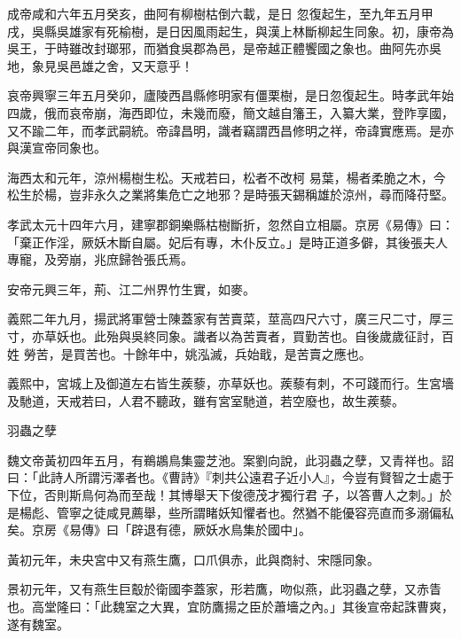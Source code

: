 \begin{pinyinscope}
 成帝咸和六年五月癸亥，曲阿有柳樹枯倒六載，是日
 忽復起生，至九年五月甲戌，吳縣吳雄家有死榆樹，是日因風雨起生，與漢上林斷柳起生同象。初，康帝為吳王，于時雖改封瑯邪，而猶食吳郡為邑，是帝越正體饗國之象也。曲阿先亦吳地，象見吳邑雄之舍，又天意乎！



 哀帝興寧三年五月癸卯，廬陵西昌縣修明家有僵栗樹，是日忽復起生。時孝武年始四歲，俄而哀帝崩，海西即位，未幾而廢，簡文越自籓王，入纂大業，登阼享國，又不踰二年，而孝武嗣統。帝諱昌明，識者竊謂西昌修明之祥，帝諱實應焉。是亦與漢宣帝同象也。



 海西太和元年，涼州楊樹生松。天戒若曰，松者不改柯
 易葉，楊者柔脆之木，今松生於楊，豈非永久之業將集危亡之地邪？是時張天錫稱雄於涼州，尋而降苻堅。



 孝武太元十四年六月，建寧郡銅樂縣枯樹斷折，忽然自立相屬。京房《易傳》曰：「棄正作淫，厥妖木斷自屬。妃后有專，木仆反立。」是時正道多僻，其後張夫人專寵，及旁崩，兆庶歸咎張氏焉。



 安帝元興三年，荊、江二州界竹生實，如麥。



 義熙二年九月，揚武將軍營士陳蓋家有苦賣菜，莖高四尺六寸，廣三尺二寸，厚三寸，亦草妖也。此殆與吳終同象。識者以為苦賣者，買勤苦也。自後歲歲征討，百姓
 勞苦，是買苦也。十餘年中，姚泓滅，兵始戢，是苦賣之應也。



 義熙中，宮城上及御道左右皆生蒺藜，亦草妖也。蒺藜有刺，不可踐而行。生宮墻及馳道，天戒若曰，人君不聽政，雖有宮室馳道，若空廢也，故生蒺藜。



 羽蟲之孽



 魏文帝黃初四年五月，有鵜鶘鳥集靈芝池。案劉向說，此羽蟲之孽，又青祥也。詔曰：「此詩人所謂污澤者也。《曹詩》『刺共公遠君子近小人』，今豈有賢智之士處于下位，否則斯鳥何為而至哉！其博舉天下俊德茂才獨行君
 子，以答曹人之刺。」於是楊彪、管寧之徒咸見薦舉，些所謂睹妖知懼者也。然猶不能優容亮直而多溺偏私矣。京房《易傳》曰「辟退有德，厥妖水鳥集於國中」。



 黃初元年，未央宮中又有燕生鷹，口爪俱赤，此與商紂、宋隱同象。



 景初元年，又有燕生巨鷇於衛國李蓋家，形若鷹，吻似燕，此羽蟲之孽，又赤眚也。高堂隆曰：「此魏室之大異，宜防鷹揚之臣於蕭墻之內。」其後宣帝起誅曹爽，遂有魏室。




\end{pinyinscope}

